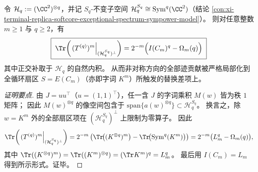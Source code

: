 \begin{conclusion}\label{con:xi-terminal-replica-softcore-spectral-leakage-localization-full-cycle-sector}
令 \(\mathcal H_q:=(\CC^2)^{\otimes q}\)，并记 \(S_q\)-不变子空间 \(\mathcal H_q^{S_q}\cong\mathrm{Sym}^q(\CC^2)\)（结论 \ref{con:xi-terminal-replica-softcore-exceptional-spectrum-sympower-model}）。
则对任意整数 \(m\ge 1\) 与 \(q\ge 2\)，有
\[
\boxed{\;
\Tr\!\left(\left.(T^{(q)})^m\right|_{(\mathcal H_q^{S_q})^{\perp}}\right)
=2^{-m}\Bigl(I(C_m)^{q}-\Omega_m(q)\Bigr)\;}
\]
其中正交补取于 \(\mathcal H_q\) 的自然内积。
从而非对称方向的全部迹贡献被严格局部化到全循环扇区 \(S=E(C_m)\)（亦即字词 \(K^m\)）所触发的替换差项上。
\end{conclusion}
\begin{proof}[证明要点]
由 \(J=uu^{\top}\)（\(u=(1,1)^{\top}\)），任一含 \(J\) 的字词乘积 \(M(w)\) 皆为秩 \(1\) 矩阵；
因此 \(M(w)^{\otimes q}\) 的像空间包含于 \(\mathrm{span}\{a(w)^{\otimes q}\}\subset \mathcal H_q^{S_q}\)。
换言之，除 \(w=K^m\) 外的全部扇区项在 \((\mathcal H_q^{S_q})^{\perp}\) 上限制为零算子。
因此
\[
\Tr\!\left(\left.(T^{(q)})^m\right|_{(\mathcal H_q^{S_q})^{\perp}}\right)
=2^{-m}\left(\Tr\!\bigl((K^{\otimes q})^m\bigr)-\Tr\!\bigl(\mathrm{Sym}^q(K^m)\bigr)\right)
=2^{-m}\bigl(L_m^{q}-\Omega_m(q)\bigr),
\]
其中 \(\Tr((K^{\otimes q})^m)=\Tr((K^m)^{\otimes q})=(\Tr K^m)^q=L_m^q\)。
最后用 \(I(C_m)=L_m\) 得到所示形式。证毕。
\end{proof}

\endinput

